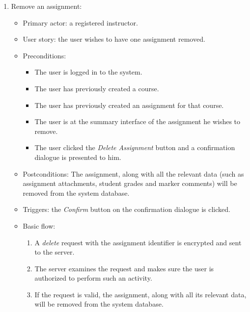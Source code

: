 \begin{enumerate}
\item Remove an assignment:
\begin{itemize}
    \item Primary actor: a registered instructor.
    \item User story: the user wishes to have one assignment removed.
    \item Preconditions:
        \begin{itemize}
            \item The user is logged in to the system.
            \item The user has previously created a course.
            \item The user has previously created an assignment for that course.
            \item The user is at the summary interface of the assignment he
                wishes to remove.
            \item The user clicked the \emph{Delete Assignment} button and a
                confirmation dialogue is presented to him.
        \end{itemize}
    \item Postconditions:
        The assignment, along with all the relevant data (such as assignment
        attachments, student grades and marker comments) will be removed from
        the system database.
    \item Triggers: the \emph{Confirm} button on the confirmation dialogue is
        clicked.
    \item Basic flow:
        \begin{enumerate}
            \item A \emph{delete} request with the assignment identifier is encrypted
                and sent to the server.
            \item The server examines the request and makes sure the user is
                authorized to perform such an activity.
            \item If the request is valid, the assignment, along with all its
                relevant data, will be removed from the system database.
        \end{enumerate}
\end{itemize}


\end{enumerate}
